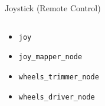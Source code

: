 \documentclass[aspectratio=43]{beamer}
\newcommand{\inline}[1]{\texttt{#1}}
\begin{document}
\begin{frame}{Joystick (Remote Control)}
	\begin{columns}
		\begin{column}{0.4\textwidth}
			\begin{itemize}
				\item \inline{joy}
				\item \inline{joy_mapper_node}
				\item \inline{wheels_trimmer_node}
				\item \inline{wheels_driver_node}
			\end{itemize}
		\end{column}
		\begin{column}{0.6\textwidth}
			\centering {}
		\end{column}
	\end{columns}
\end{frame}
\end{document}
